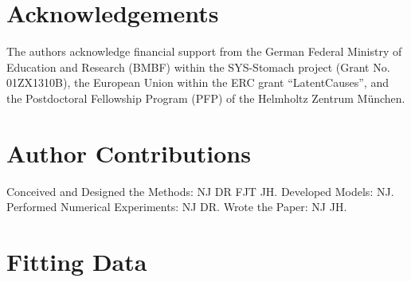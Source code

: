 \documentclass[10pt,letterpaper]{article}
\begin{document}
\section*{Acknowledgements}


The authors acknowledge financial support from the German Federal Ministry of Education and Research (BMBF) within the SYS-Stomach project (Grant No. 01ZX1310B), the European Union within the ERC grant ``LatentCauses'', and the Postdoctoral Fellowship Program (PFP) of the Helmholtz Zentrum M\"unchen.

\section*{Author Contributions}

Conceived and Designed the Methods: NJ DR FJT JH.
Developed Models: NJ.
Performed Numerical Experiments: NJ DR.
Wrote the Paper: NJ JH.

\nolinenumbers





\newpage
\appendix
\section{Fitting Data}
\end{document}
